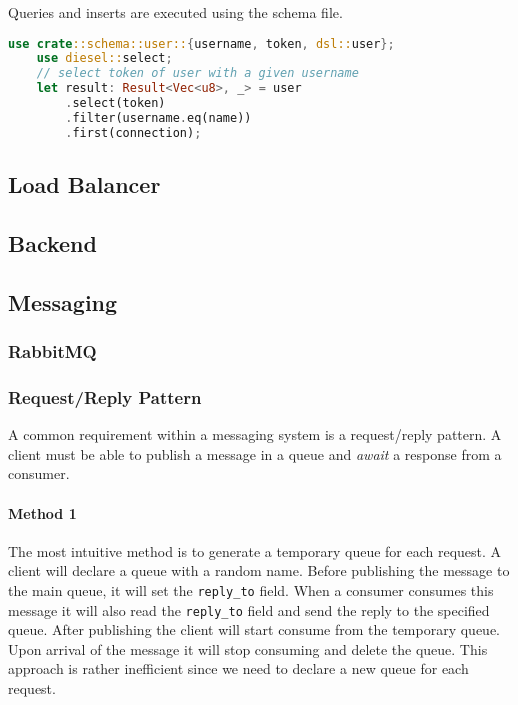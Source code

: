 \documentclass[../documentation.tex]{subfiles}
\begin{document}
Queries and inserts are executed using the schema file.

\begin{lstlisting}[language=Rust, style=boxed, numbers=none]
    use crate::schema::user::{username, token, dsl::user};
    use diesel::select;
    // select token of user with a given username
    let result: Result<Vec<u8>, _> = user
        .select(token)
        .filter(username.eq(name))
        .first(connection);
\end{lstlisting}

\subsection{Load Balancer}

\subsection{Backend}

\subsection{Messaging}

\subsubsection{RabbitMQ}


\pagebreak

\subsubsection{Request/Reply Pattern}

A common requirement within a messaging system is a request/reply pattern.
A client must be able to publish a message in a queue and \textit{await}
a response from a consumer.

\paragraph{Method 1} The most intuitive method is to generate a temporary queue for each request.
A client will declare a queue with a random name. Before publishing the message to the main queue,
it will set the \texttt{reply\_to} field. When a consumer consumes this message it will also read the
\texttt{reply\_to} field and send the reply to the specified queue. After publishing the client will start consume
from the temporary queue. Upon arrival of the message it will stop consuming and delete the queue.
This approach is rather inefficient since we need to declare a new queue for each request.
\end{document}
